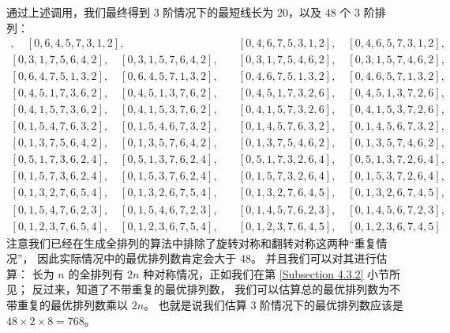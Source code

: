 通过上述调用，我们最终得到 $3$ 阶情况下的最短线长为 $20$，以及 $48$ 个 $3$ 阶排列：
\begin{align*}
[0, 6, 4, 7, 5, 3, 1, 2], \quad [0, 6, 4, 5, 7, 3, 1, 2], & \quad [0, 4, 6, 7, 5, 3, 1, 2], \quad [0, 4, 6, 5, 7, 3, 1, 2], \\
[0, 3, 1, 7, 5, 6, 4, 2], \quad [0, 3, 1, 5, 7, 6, 4, 2], & \quad [0, 3, 1, 7, 5, 4, 6, 2], \quad [0, 3, 1, 5, 7, 4, 6, 2], \\
[0, 6, 4, 7, 5, 1, 3, 2], \quad [0, 6, 4, 5, 7, 1, 3, 2], & \quad [0, 4, 6, 7, 5, 1, 3, 2], \quad [0, 4, 6, 5, 7, 1, 3, 2], \\
[0, 4, 5, 1, 7, 3, 6, 2], \quad [0, 4, 5, 1, 3, 7, 6, 2], & \quad [0, 4, 5, 1, 7, 3, 2, 6], \quad [0, 4, 5, 1, 3, 7, 2, 6], \\
[0, 4, 1, 5, 7, 3, 6, 2], \quad [0, 4, 1, 5, 3, 7, 6, 2], & \quad [0, 4, 1, 5, 7, 3, 2, 6], \quad [0, 4, 1, 5, 3, 7, 2, 6], \\
[0, 1, 5, 4, 7, 6, 3, 2], \quad [0, 1, 5, 4, 6, 7, 3, 2], & \quad [0, 1, 4, 5, 7, 6, 3, 2], \quad [0, 1, 4, 5, 6, 7, 3, 2], \\
[0, 1, 3, 7, 5, 6, 4, 2], \quad [0, 1, 3, 5, 7, 6, 4, 2], & \quad [0, 1, 3, 7, 5, 4, 6, 2], \quad [0, 1, 3, 5, 7, 4, 6, 2], \\
[0, 5, 1, 7, 3, 6, 2, 4], \quad [0, 5, 1, 3, 7, 6, 2, 4], & \quad [0, 5, 1, 7, 3, 2, 6, 4], \quad [0, 5, 1, 3, 7, 2, 6, 4], \\
[0, 1, 5, 7, 3, 6, 2, 4], \quad [0, 1, 5, 3, 7, 6, 2, 4], & \quad [0, 1, 5, 7, 3, 2, 6, 4], \quad [0, 1, 5, 3, 7, 2, 6, 4], \\
[0, 1, 3, 2, 7, 6, 5, 4], \quad [0, 1, 3, 2, 6, 7, 5, 4], & \quad [0, 1, 3, 2, 7, 6, 4, 5], \quad [0, 1, 3, 2, 6, 7, 4, 5], \\
[0, 1, 5, 4, 7, 6, 2, 3], \quad [0, 1, 5, 4, 6, 7, 2, 3], & \quad [0, 1, 4, 5, 7, 6, 2, 3], \quad [0, 1, 4, 5, 6, 7, 2, 3], \\
[0, 1, 2, 3, 7, 6, 5, 4], \quad [0, 1, 2, 3, 6, 7, 5, 4], & \quad [0, 1, 2, 3, 7, 6, 4, 5], \quad [0, 1, 2, 3, 6, 7, 4, 5]
\end{align*}
注意我们已经在生成全排列的算法中排除了旋转对称和翻转对称这两种“重复情况”，
因此实际情况中的最优排列数肯定会大于 $48$。
并且我们可以对其进行估算：
长为 $n$ 的全排列有 $2 n$ 种对称情况，正如我们在第 \ref{Subsection 4.3.2} 小节所见；
反过来，知道了不带重复的最优排列数，
我们可以估算总的最优排列数为不带重复的最优排列数乘以 $2 n$。
也就是说我们估算 $3$ 阶情况下的最优排列数应该是 $48 \times 2 \times 8 = 768$。

